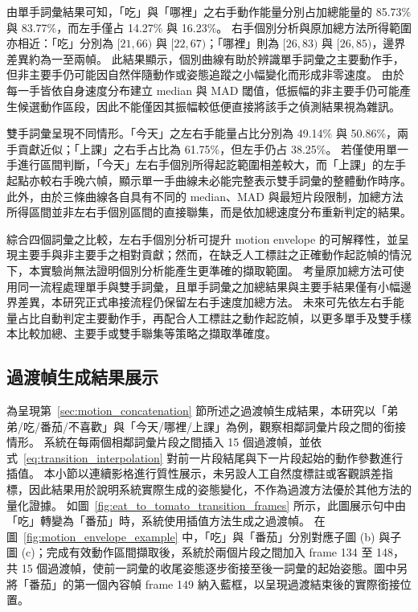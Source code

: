 \documentclass[class=NCU_thesis, crop=false]{standalone}
\begin{document}
由單手詞彙結果可知，「吃」與「哪裡」之右手動作能量分別占加總能量的 85.73\% 與 83.77\%，而左手僅占 14.27\% 與 16.23\%。
右手個別分析與原加總方法所得範圍亦相近：「吃」分別為 $[21,66)$ 與 $[22,67)$；「哪裡」則為 $[26,83)$ 與 $[26,85)$，邊界差異約為一至兩幀。
此結果顯示，個別曲線有助於辨識單手詞彙之主要動作手，但非主要手仍可能因自然伴隨動作或姿態追蹤之小幅變化而形成非零速度。
由於每一手皆依自身速度分布建立 median 與 MAD 閾值，低振幅的非主要手仍可能產生候選動作區段，因此不能僅因其振幅較低便直接將該手之偵測結果視為雜訊。

雙手詞彙呈現不同情形。「今天」之左右手能量占比分別為 49.14\% 與 50.86\%，兩手貢獻近似；「上課」之右手占比為 61.75\%，但左手仍占 38.25\%。
若僅使用單一手進行區間判斷，「今天」左右手個別所得起訖範圍相差較大，而「上課」的左手起點亦較右手晚六幀，顯示單一手曲線未必能完整表示雙手詞彙的整體動作時序。
此外，由於三條曲線各自具有不同的 median、MAD 與最短片段限制，加總方法所得區間並非左右手個別區間的直接聯集，而是依加總速度分布重新判定的結果。

綜合四個詞彙之比較，左右手個別分析可提升 motion envelope 的可解釋性，並呈現主要手與非主要手之相對貢獻；然而，在缺乏人工標註之正確動作起訖幀的情況下，本實驗尚無法證明個別分析能產生更準確的擷取範圍。
考量原加總方法可使用同一流程處理單手與雙手詞彙，且單手詞彙之加總結果與主要手結果僅有小幅邊界差異，本研究正式串接流程仍保留左右手速度加總方法。
未來可先依左右手能量占比自動判定主要動作手，再配合人工標註之動作起訖幀，以更多單手及雙手樣本比較加總、主要手或雙手聯集等策略之擷取準確度。

\subsection{過渡幀生成結果展示}
\label{sec:exp_smoothing_result}

為呈現第~\ref{sec:motion_concatenation} 節所述之過渡幀生成結果，本研究以「弟弟/吃/番茄/不喜歡」與「今天/哪裡/上課」為例，觀察相鄰詞彙片段之間的銜接情形。
系統在每兩個相鄰詞彙片段之間插入 15 個過渡幀，並依式~\eqref{eq:transition_interpolation} 對前一片段結尾與下一片段起始的動作參數進行插值。
本小節以連續影格進行質性展示，未另設人工自然度標註或客觀誤差指標，因此結果用於說明系統實際生成的姿態變化，不作為過渡方法優於其他方法的量化證據。
如圖~\ref{fig:eat_to_tomato_transition_frames} 所示，此圖展示句中由「吃」轉變為「番茄」時，系統使用插值方法生成之過渡幀。
在圖~\ref{fig:motion_envelope_example} 中，「吃」與「番茄」分別對應子圖 (b) 與子圖 (c)；完成有效動作區間擷取後，系統於兩個片段之間加入 frame 134 至 148，共 15 個過渡幀，使前一詞彙的收尾姿態逐步銜接至後一詞彙的起始姿態。圖中另將「番茄」的第一個內容幀 frame 149 納入藍框，以呈現過渡結束後的實際銜接位置。
\end{document}
